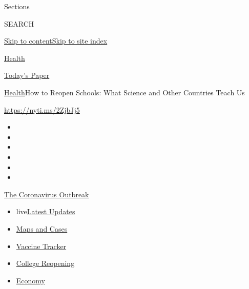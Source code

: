 Sections

SEARCH

\protect\hyperlink{site-content}{Skip to
content}\protect\hyperlink{site-index}{Skip to site index}

\href{https://www.nytimes3xbfgragh.onion/section/health}{Health}

\href{https://myaccount.nytimes3xbfgragh.onion/auth/login?response_type=cookie\&client_id=vi}{}

\href{https://www.nytimes3xbfgragh.onion/section/todayspaper}{Today's
Paper}

\href{/section/health}{Health}\textbar{}How to Reopen Schools: What
Science and Other Countries Teach Us

\url{https://nyti.ms/2ZjbJj5}

\begin{itemize}
\item
\item
\item
\item
\item
\item
\end{itemize}

\href{https://www.nytimes3xbfgragh.onion/news-event/coronavirus?action=click\&pgtype=Article\&state=default\&region=TOP_BANNER\&context=storylines_menu}{The
Coronavirus Outbreak}

\begin{itemize}
\tightlist
\item
  live\href{https://www.nytimes3xbfgragh.onion/2020/08/04/world/coronavirus-covid-19.html?action=click\&pgtype=Article\&state=default\&region=TOP_BANNER\&context=storylines_menu}{Latest
  Updates}
\item
  \href{https://www.nytimes3xbfgragh.onion/interactive/2020/us/coronavirus-us-cases.html?action=click\&pgtype=Article\&state=default\&region=TOP_BANNER\&context=storylines_menu}{Maps
  and Cases}
\item
  \href{https://www.nytimes3xbfgragh.onion/interactive/2020/science/coronavirus-vaccine-tracker.html?action=click\&pgtype=Article\&state=default\&region=TOP_BANNER\&context=storylines_menu}{Vaccine
  Tracker}
\item
  \href{https://www.nytimes3xbfgragh.onion/2020/08/02/us/covid-college-reopening.html?action=click\&pgtype=Article\&state=default\&region=TOP_BANNER\&context=storylines_menu}{College
  Reopening}
\item
  \href{https://www.nytimes3xbfgragh.onion/live/2020/08/03/business/stock-market-today-coronavirus?action=click\&pgtype=Article\&state=default\&region=TOP_BANNER\&context=storylines_menu}{Economy}
\end{itemize}

